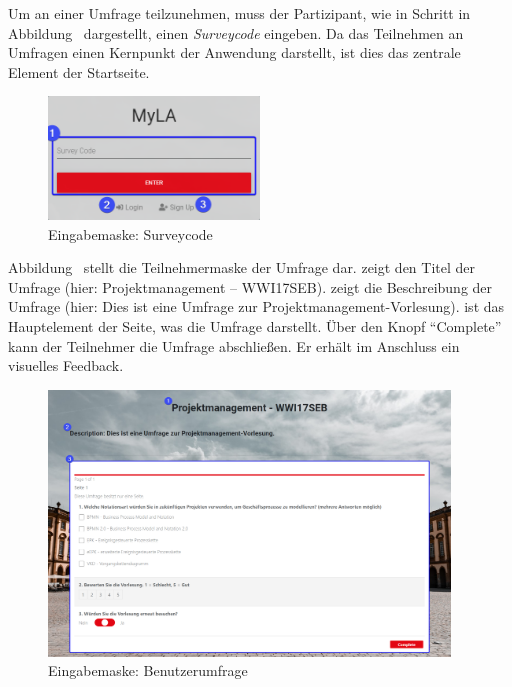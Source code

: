 Um an einer Umfrage teilzunehmen, muss der Partizipant, wie in Schritt \desOne in Abbildung~ dargestellt, einen \emph{Surveycode} eingeben.
Da das Teilnehmen an Umfragen einen Kernpunkt der Anwendung darstellt, ist dies das zentrale Element der Startseite.

\begin{figure}[H]
	\centering
	\includegraphics[width=0.5\textwidth, keepaspectratio]{img/guide/SurveyCode.png}
	\captionsetup{justification=centering, format=plain}
	\caption[Eingabemaske: Surveycode]{Eingabemaske: Surveycode \\\quelleScreenshot}
	\label{fig:EingabemaskeSurveycode}
\end{figure}

Abbildung~ stellt die Teilnehmermaske der Umfrage dar.
\desOne zeigt den Titel der Umfrage (hier: Projektmanagement -- WWI17SEB).
\desTwo zeigt die Beschreibung der Umfrage (hier: Dies ist eine Umfrage zur Projektmanagement-Vorlesung).
\desThree ist das Hauptelement der Seite, was die Umfrage darstellt.
Über den Knopf \enquote{Complete} kann der Teilnehmer die Umfrage abschließen.
Er erhält im Anschluss ein visuelles Feedback.
% 
\begin{figure}[H]
	\centering
	\includegraphics[width=0.95\textwidth, keepaspectratio]{img/guide/SurveyParticipate.png}
	\captionsetup{justification=centering, format=plain}
	\caption[Eingabemaske: Benutzerumfrage]{Eingabemaske: Benutzerumfrage \\\quelleScreenshot}
	\label{fig:Teilnehmermaske}
\end{figure}
% 
